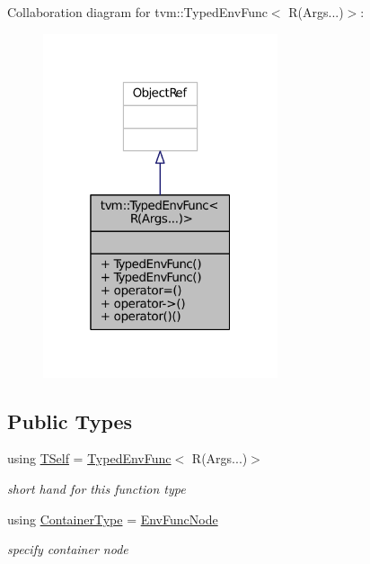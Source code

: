 Collaboration diagram for tvm\+:\+:Typed\+Env\+Func$<$ R(Args...)$>$\+:
\nopagebreak
\begin{figure}[H]
\begin{center}
\leavevmode
\includegraphics[width=196pt]{classtvm_1_1TypedEnvFunc_3_01R_07Args_8_8_8_08_4__coll__graph}
\end{center}
\end{figure}
\subsection*{Public Types}
\begin{DoxyCompactItemize}
\item 
using \hyperlink{classtvm_1_1TypedEnvFunc_3_01R_07Args_8_8_8_08_4_a29adf4db79c99318db779a71f26acc0f}{T\+Self} = \hyperlink{classtvm_1_1TypedEnvFunc}{Typed\+Env\+Func}$<$ R(Args...)$>$
\begin{DoxyCompactList}\small\item\em short hand for this function type \end{DoxyCompactList}\item 
using \hyperlink{classtvm_1_1TypedEnvFunc_3_01R_07Args_8_8_8_08_4_a5ab2d64bd5e6a0d5dbce945a0d5f8b30}{Container\+Type} = \hyperlink{classtvm_1_1EnvFuncNode}{Env\+Func\+Node}
\begin{DoxyCompactList}\small\item\em specify container node \end{DoxyCompactList}\end{DoxyCompactItemize}
